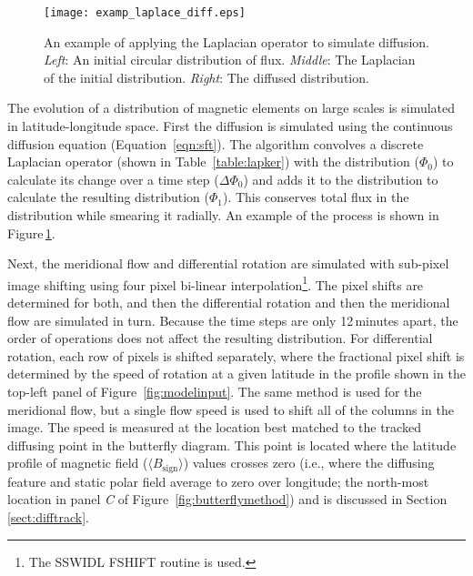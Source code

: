  \begin{figure}[!t]    %
   \centerline{\texttt{[image: examp\_laplace\_diff.eps]}
              }
              \caption[An example of applying the Laplacian operator to simulate diffusion.]{An example of applying the Laplacian operator to simulate diffusion. \emph{Left}: An initial circular distribution of flux. \emph{Middle}: The Laplacian of the initial distribution. \emph{Right}: The diffused distribution.}
   \label{fig:laplaceexamp}
   \end{figure}

The evolution of a distribution of magnetic elements on large scales is simulated in latitude-longitude space. First the diffusion is simulated using the continuous diffusion equation (Equation~\ref{eqn:sft}). The algorithm convolves a discrete Laplacian operator (shown in Table~\ref{table:lapker}) with the distribution ($\Phi_0$) to calculate its change over a time step ($\Delta \Phi_0$) and adds it to the distribution to calculate the resulting distribution ($\Phi_1$). This conserves total flux in the distribution while smearing it radially. An example of the process is shown in Figure\,\ref{fig:laplaceexamp}.

Next, the meridional flow and differential rotation are simulated with sub-pixel image shifting using four pixel bi-linear interpolation\footnote{The SSWIDL {FSHIFT} routine is used.}. The pixel shifts are determined for both, and then the differential rotation and then the meridional flow are simulated in turn. Because the time steps are only 12\,minutes apart, the order of operations does not affect the resulting distribution.
For differential rotation, each row of pixels is shifted separately, where the fractional pixel shift is determined by the speed of rotation at a given latitude in the profile shown in the top-left panel of Figure~\ref{fig:modelinput}. The same method is used for the meridional flow, but a single flow speed is used to shift all of the columns in the image. The speed is measured at the location best matched to the tracked diffusing point in the butterfly diagram. This point is located where the latitude profile of magnetic field ($\langle B_\mathrm{sign} \rangle$) values crosses zero (i.e., where the diffusing feature and static polar field average to zero over longitude; the north-most location in panel \emph{C} of Figure~\ref{fig:butterflymethod}) and is discussed in Section\,\ref{sect:difftrack}. 



